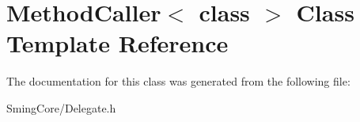 \hypertarget{class_method_caller}{}\section{Method\+Caller$<$ class $>$ Class Template Reference}
\label{class_method_caller}


The documentation for this class was generated from the following file\+:\begin{DoxyCompactItemize}
\item 
Sming\+Core/Delegate.\+h\end{DoxyCompactItemize}
